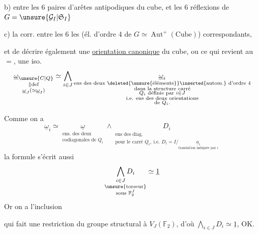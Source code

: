 b)  entre les $6$ paires d'arêtes antipodiques du cube, et les $6$  réflexions de $G=\unsure{\mathcal{G}_I|\mathfrak{S}_I}$

c) la corr. entre les $6$  les  (él. d'ordre $4$ de $G\simeq\operatorname{Aut}^+(\text{Cube})$) correspondants,

et de décrire également une \uline{orientation canonique} du cube, ou ce qui revient au $=$, une  iso.
\[
\underset{\substack{\Vert\mathrm{def}\\\underline{\omega}_J(\simeq\underline{\omega}_I)}}
{\underline{\omega}_{\unsure{C|Q}}}
\simeq \bigwedge_{i\in J}
\underset{\substack{\text{ens des deux \deleted{\unsure{éléments}}\inserted{autom.} d'ordre $4$}\\
\text{dans la structure carré}\\
Q_i\text{ définie par }i\in J\\
\text{i.e. ens des deux orientations}\\
\text{de }Q_i.}}{\underline{\omega}_i}
\]

Comme on a
\[
\underline{\omega}_i\simeq
\underset{\substack{\text{ens. des deux}\\\text{codiagonales de }Q_i}}
{\underline{\omega}}\wedge
\underset{\substack{\text{ens des diag.}\\
\text{pour le carré }Q_i,\ \text{i.e. }D_i=
I/\underset{\text{translation indiquée par }i}{\underline{a}_i}}}{D_i}
\]
la formule  s'écrit aussi
\[
\underset{\substack{\text{\unsure{torseur}}\\\text{sous }\mathbb{F}_2^J}}
{\bigwedge_{i\in J}D_i}\simeq\underline{1}
\]
Or on a  l'inclusion

qui fait une restriction du groupe structural à $V_J(\mathbb{F}_2)$, d'où $\bigwedge_{i\in J}D_i\simeq\underline{1}$, OK.

